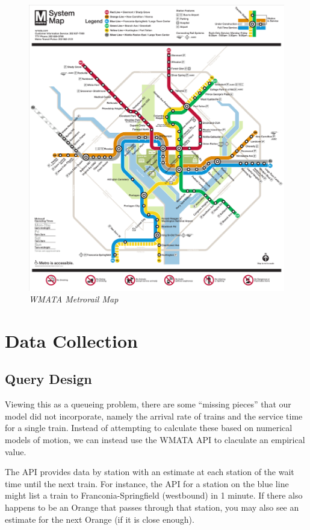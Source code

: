 \documentclass[a4paper,12pt]{article}
\begin{document}
\begin{figure}
\begin{center}
\includegraphics[width=5in]{../images/metro_map.pdf}
\caption{\small \sl WMATA Metrorail Map \label{fig:metromap} \cite{fioroni}}
\end{center}
\end{figure}

\section{Data Collection}

\subsection{Query Design}
Viewing this as a queueing problem, there are some ``missing pieces'' that our model did not incorporate, namely the
arrival rate of trains and the service time for a single train. Instead of attempting to calculate these based on 
numerical models of motion, we can instead use the WMATA API \cite{wmataapi} to claculate an empirical value.

The API provides data by station with an estimate at each station of the wait time until the next train. For instance,
the API for a station on the blue line might list a train to Franconia-Springfield (westbound) in 1 minute. If there
also happens to be an Orange that passes through that station, you may also see an estimate for the next Orange (if it
is close enough).
\end{document}
